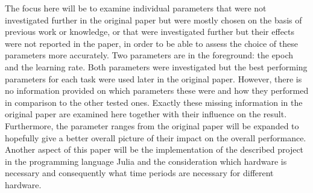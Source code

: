 The focus here will be to examine individual parameters that were not investigated further in the original paper but were mostly chosen on the basis of previous work or knowledge, or that were investigated further but their effects were not reported in the paper, in order to be able to assess the choice of these parameters more accurately. Two parameters are in the foreground: the epoch and the learning rate. Both parameters were investigated but the best performing parameters for each task were used later in the original paper. However, there is no information provided on which parameters these were and how they performed in comparison to the other tested ones. Exactly these missing information in the original paper are examined here together with their influence on the result. Furthermore, the parameter ranges from the original paper will be expanded to hopefully give a better overall picture of their impact on the overall performance.  Another aspect of this paper will be the implementation of the described project in the programming language Julia and the consideration which hardware is necessary and consequently what time periods are necessary for different hardware. 
\color{black}

